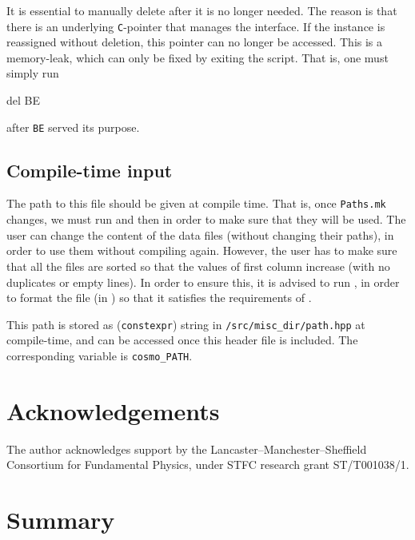\documentclass[11pt,a4paper]{article}
\begin{document}
It is essential to manually delete  after it is no longer needed. The reason is that there is an underlying {\tt C}-pointer that manages the \PY interface. If the instance is reassigned without deletion, this pointer can no longer be accessed. This is a memory-leak, which can only be fixed by exiting the script. 
%
That is, one must simply run 
%
\begin{py}
	del BE
\end{py}  
%
after {\tt BE} served its purpose.


\subsection{Compile-time input}\label{sec:compile_time_input} 
%

The path to this file should be given at compile time. That is, once {\tt Paths.mk} changes, we must run  and then  in order to make sure that they will be used. The user can change the content of the data files (without changing their paths), in order to use them without compiling \nsc again. However, the user has to make sure that all the files are sorted so that the values of first column increase (with no duplicates or empty lines). In order to ensure this, it is advised to run , in order to format the file (in ) so that it satisfies the requirements of \nsc.

This path is stored as ({\tt constexpr}) string in {\tt \nsc/src/misc\_dir/path.hpp} at compile-time, and can be accessed once this header file is included. The corresponding variable is {\tt cosmo\_PATH}.








\section{Acknowledgements}
%
The author acknowledges support by the Lancaster–Manchester–Sheffield Consortium for Fundamental Physics, under STFC research grant ST/T001038/1.


\section{Summary}


\setcounter{section}{0}
\end{document}
